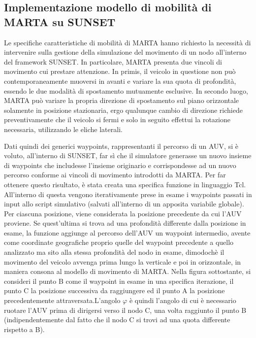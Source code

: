\documentclass[Lau,binding=0.6cm]{sapthesis}
\begin{document}
\subsection{Implementazione modello di mobilità di MARTA su SUNSET}
Le specifiche caratteristiche di mobilità di MARTA hanno richiesto la necessità di intervenire sulla gestione della simulazione del movimento di un nodo all'interno del framework SUNSET. \newline In particolare, MARTA presenta due vincoli di movimento cui prestare attenzione. In primis, il veicolo in questione non può contemporaneamente muoversi in avanti e variare la sua quota di profondità, essendo le due modalità di spostamento mutuamente esclusive. In secondo luogo, MARTA può variare la propria direzione di spostamento sul piano orizzontale solamente in posizione stazionaria, ergo qualunque cambio di direzione richiede preventivamente che il veicolo si fermi e solo in seguito effettui la rotazione necessaria, utilizzando le eliche laterali.\par
Dati quindi dei generici waypoints, rappresentanti il percorso di un AUV, si è voluto, all'interno di SUNSET, far sì che il simulatore generasse un nuovo insieme di waypoints che includesse l'insieme originario e corrispondesse ad un nuovo percorso conforme ai vincoli di movimento introdotti da MARTA. \newline Per far ottenere questo risultato, è stata creata una specifica funzione in linguaggio Tcl.  All'interno di questa vengono iterativamente prese in esame i waypoints passati in input allo script simulativo (salvati all'interno di un apposita variabile globale). Per ciascuna posizione, viene considerata la posizione precedente da cui l'AUV proviene. Se quest'ultima si trova ad una profondità differente dalla posizione in esame, la funzione aggiunge al percorso dell'AUV un waypoint intermedio, avente come coordinate geografiche proprio quelle del waypoint precedente a quello analizzato ma sito alla stessa profondità del nodo in esame, dimodochè il movimento del veicolo avvenga prima lungo la verticale e poi in orizzontale, in maniera consona al modello di movimento di MARTA.\newline
Nella figura sottostante, si consideri il punto B come il waypoint in esame in una specifica iterazione, il punto C la posizione successiva da raggiungere ed il punto A la posizione precedentemente attraversata.\newline L'angolo $\varphi$  è quindi l'angolo di cui è necessario ruotare l'AUV prima di dirigersi verso il nodo C, una volta raggiunto il punto B (indipendentemente dal fatto che il nodo C si trovi ad una quota differente rispetto a B). 
\end{document}
